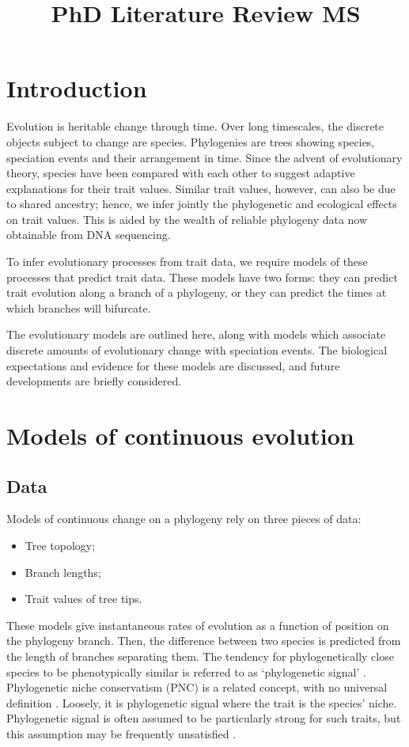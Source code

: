 \documentclass[12pt]{article}
\title{PhD Literature Review MS}
\date{}
\author{}
\begin{document}
\maketitle
\tableofcontents
\newpage

\section{Introduction}

Evolution is heritable change through time. Over long timescales, the discrete objects subject to change are species. Phylogenies are trees showing species, speciation events and their arrangement in time. Since the advent of evolutionary theory, species have been compared with each other to suggest adaptive explanations for their trait values. Similar trait values, however, can also be due to shared ancestry; hence, we infer jointly the phylogenetic and ecological effects on trait values. This is aided by the wealth of reliable phylogeny data now obtainable from DNA sequencing.

To infer evolutionary processes from trait data, we require models of these processes that predict trait data. These models have two forms: they can predict trait evolution along a branch of a phylogeny, or they can predict the times at which branches will bifurcate. 

The evolutionary models are outlined here, along with models which associate discrete amounts of evolutionary change with speciation events. The biological expectations and evidence for these models are discussed, and future developments are briefly considered.

\section{Models of continuous evolution}

\subsection{Data}

Models of continuous change on a phylogeny rely on three pieces of data:
\begin{itemize}
  \item Tree topology;
  \item Branch lengths;
  \item Trait values of tree tips.
\end{itemize}

These models give instantaneous rates of evolution as a function of position on the phylogeny branch. Then, the difference between two species is predicted from the length of branches separating them. The tendency for phylogenetically close species to be phenotypically similar is referred to as `phylogenetic signal' \citep{blomberg_testing_2003}. Phylogenetic niche conservatism (PNC) is a related concept, with no universal definition \citep{cooper_phylogenetic_2010}. Loosely, it is phylogenetic signal where the trait is the species' niche. Phylogenetic signal is often assumed to be particularly strong for such traits, but this assumption may be frequently unsatisfied \citep{losos_phylogenetic_2008}. 
\end{document}
